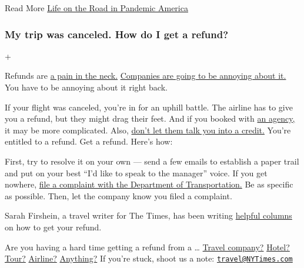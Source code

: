  Read More
\href{https://www.nytimes3xbfgragh.onion/2020/06/14/business/coronavirus-road-trip.html}{Life
on the Road in Pandemic America}

\hypertarget{my-trip-was-canceled-how-do-i-get-a-refund}{%
\subsubsection{My trip was canceled. How do I get a
refund?}\label{my-trip-was-canceled-how-do-i-get-a-refund}}

+

Refunds are
\href{https://www.nytimes3xbfgragh.onion/2020/04/18/your-money/coronavirus-refunds.html}{a
pain in the neck.}
\href{https://www.nytimes3xbfgragh.onion/2020/06/12/travel/virus-airlines-private-arbitration.html}{Companies
are going to be annoying about it.} You have to be annoying about it
right back.

If your flight was canceled, you're in for an uphill battle. The airline
has to give you a refund, but they might drag their feet. And if you
booked with
\href{https://www.nytimes3xbfgragh.onion/2020/04/03/travel/coronavirus-refund-travel-ota.html}{an
agency,} it may be more complicated. Also,
\href{https://www.nytimes3xbfgragh.onion/2020/05/12/travel/refunds-or-credits-travelers-and-businesses-face-off.html}{don't
let them talk you into a credit.} You're entitled to a refund. Get a
refund. Here's how:

First, try to resolve it on your own --- send a few emails to establish
a paper trail and put on your best ``I'd like to speak to the manager''
voice. If you get nowhere,
\href{https://airconsumer.dot.gov/escomplaint/ConsumerForm.cfm}{file a
complaint with the Department of Transportation.} Be as specific as
possible. Then, let the company know you filed a complaint.

Sarah Firshein, a travel writer for The Times, has been writing
\href{https://www.nytimes3xbfgragh.onion/2019/09/15/reader-center/travel-sarah-firshein-tripped-up-columnist.html}{helpful
columns} on how to get your refund.

Are you having a hard time getting a refund from a \ldots{}
\href{https://www.nytimes3xbfgragh.onion/2020/05/25/travel/coronavirus-refunds-overseas-adventure-travel.html}{Travel
company?}
\href{https://www.nytimes3xbfgragh.onion/2020/07/07/travel/virus-refunds-hotel-franchises.html}{Hotel?}
\href{https://www.nytimes3xbfgragh.onion/2020/04/11/travel/coronavirus-travel-trip-refunds.html}{Tour?}
\href{https://www.nytimes3xbfgragh.onion/2020/05/01/travel/trip-refund-airlines.html}{Airline?}
\href{https://www.nytimes3xbfgragh.onion/2020/06/18/travel/travel-refunds-airlines.html}{Anything?}
If you're stuck, shoot us a note:
\href{mailto:travel@NYTimes.com}{\nolinkurl{travel@NYTimes.com}}

